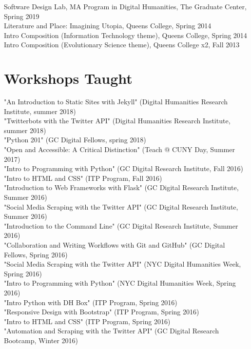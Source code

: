 \documentclass[11pt]{article}
\begin{document}
Software Design Lab, MA Program in Digital Humanities, The Graduate Center, Spring 2019\\
Literature and Place: Imagining Utopia, Queens College, Spring 2014\\
Intro Composition (Information Technology theme), Queens College, Spring 2014\\
Intro Composition (Evolutionary Science theme), Queens College  x2, Fall 2013\\

\section*{Workshops Taught}
\label{sec:orgheadline10}
"An Introduction to Static Sites with Jekyll" (Digital Humanities Research Institute, summer 2018)\\
"Twitterbots with the Twitter API" (Digital Humanities Research Institute, summer 2018)\\
"Python 201" (GC Digital Fellows, spring 2018)\\
"Open and Accessible: A Critical Distinction" (Teach @ CUNY Day, Summer 2017)\\
"Intro to Programming with Python" (GC Digital Research Institute, Fall 2016)\\
"Intro to HTML and CSS" (ITP Program, Fall 2016)\\
"Introduction to Web Frameworks with Flask" (GC Digital Research Institute, Summer 2016)\\
"Social Media Scraping with the Twitter API" (GC Digital Research Institute, Summer 2016)\\
"Introduction to the Command Line" (GC Digital Research Institute, Summer 2016)\\
"Collaboration and Writing Workflows with Git and GitHub" (GC Digital Fellows, Spring 2016)\\
"Social Media Scraping with the Twitter API" (NYC Digital Humanities Week, Spring 2016)\\
"Intro to Programming with Python" (NYC Digital Humanities Week, Spring 2016)\\
"Intro Python with DH Box" (ITP Program, Spring 2016)\\
"Responsive Design with Bootstrap" (ITP Program, Spring 2016)\\
"Intro to HTML and CSS" (ITP Program, Spring 2016)\\
"Automation and Scraping with the Twitter API" (GC Digital Research Bootcamp, Winter 2016)\\
\end{document}
